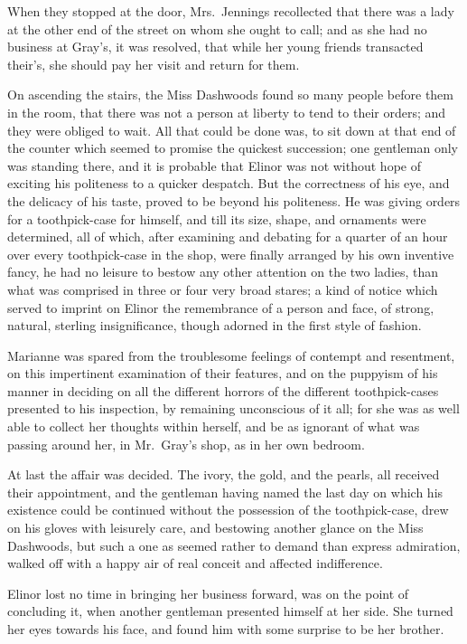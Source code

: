 When they stopped at the door, Mrs.\ Jennings recollected
that there was a lady at the other end of the street
on whom she ought to call; and as she had no business
at Gray's, it was resolved, that while her young friends
transacted their's, she should pay her visit and
return for them.

On ascending the stairs, the Miss Dashwoods found
so many people before them in the room, that there was
not a person at liberty to tend to their orders; and they
were obliged to wait.  All that could be done was, to sit
down at that end of the counter which seemed to promise the
quickest succession; one gentleman only was standing there,
and it is probable that Elinor was not without hope
of exciting his politeness to a quicker despatch.
But the correctness of his eye, and the delicacy
of his taste, proved to be beyond his politeness.
He was giving orders for a toothpick-case for himself,
and till its size, shape, and ornaments were determined,
all of which, after examining and debating for a quarter
of an hour over every toothpick-case in the shop,
were finally arranged by his own inventive fancy, he had
no leisure to bestow any other attention on the two ladies,
than what was comprised in three or four very broad stares;
a kind of notice which served to imprint on Elinor
the remembrance of a person and face, of strong,
natural, sterling insignificance, though adorned in
the first style of fashion.

Marianne was spared from the troublesome feelings
of contempt and resentment, on this impertinent examination
of their features, and on the puppyism of his manner
in deciding on all the different horrors of the different
toothpick-cases presented to his inspection, by remaining
unconscious of it all; for she was as well able to collect
her thoughts within herself, and be as ignorant of what was
passing around her, in Mr.\ Gray's shop, as in her own bedroom.

At last the affair was decided.  The ivory,
the gold, and the pearls, all received their appointment,
and the gentleman having named the last day on which his
existence could be continued without the possession of the
toothpick-case, drew on his gloves with leisurely care,
and bestowing another glance on the Miss Dashwoods, but such
a one as seemed rather to demand than express admiration,
walked off with a happy air of real conceit and affected
indifference.

Elinor lost no time in bringing her business forward,
was on the point of concluding it, when another gentleman
presented himself at her side.  She turned her eyes towards
his face, and found him with some surprise to be her brother.

